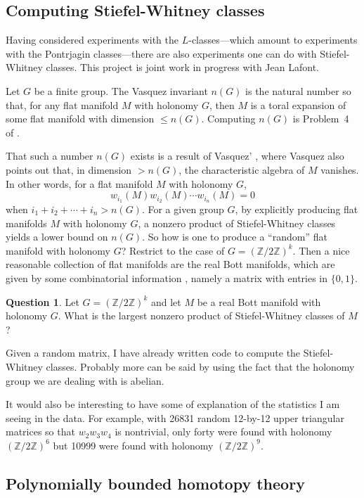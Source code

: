 \documentclass[12pt]{amsart}
\theoremstyle{definition}
\newtheorem{question}[theorem]{Question}
\newcommand{\Z}{\mathbb{Z}}
\begin{document}
\subsection{Computing Stiefel-Whitney classes}

Having considered experiments with the $L$-classes---which amount to
experiments with the Pontrjagin classes---there are also experiments
one can do with Stiefel-Whitney classes.  This project is joint work
in progress with Jean Lafont.

Let $G$ be a finite group.  The Vasquez invariant $n(G)$ is the
natural number so that, for any flat manifold $M$ with holonomy $G$,
then $M$ is a toral expansion of some flat manifold with dimension
$\leq n(G)$.  Computing $n(G)$ is Problem~4 of \cite{MR2252897}.

That such a number $n(G)$ exists is a result of Vasquez'
\cite{MR267487}, where Vasquez also points out that, in dimension $>
n(G)$, the characteristic algebra of $M$ vanishes.  In other words,
for a flat manifold $M$ with holonomy $G$, 
$$
w_{i_1}(M) w_{i_2}(M) \cdots w_{i_n}(M) = 0
$$
when $i_1 + i_2 + \cdots + i_n > n(G)$. For a given group $G$, by
explicitly producing flat manifolds $M$ with holonomy $G$, a nonzero
product of Stiefel-Whitney classes yields a lower bound on $n(G)$.  So
 how is one to produce a ``random'' flat manifold with holonomy $G$?
 Restrict to the case of $G = (\Z/2\Z)^k$.  Then a nice reasonable
 collection of flat manifolds are the real Bott manifolds, which are
 given by some combinatorial information \cite{MR2915482}, namely a
 matrix with entries in $\{0,1\}$.
\begin{question}
  Let $G = (\Z/2\Z)^k$ and let $M$ be a real Bott manifold with
   holonomy $G$.  What is the largest nonzero product of
   Stiefel-Whitney classes of $M$?
\end{question}
 Given a random matrix, I have already written code to compute the
 Stiefel-Whitney classes.  Probably more can be said by using the fact
 that the holonomy group we are dealing with is abelian.

 It would also be interesting to have some of explanation of the
 statistics I am seeing in the data.  For example, with 26831 random
 12-by-12 upper triangular matrices so that $w_2 w_3 w_4$ is
 nontrivial, only forty were found with holonomy $(\Z/2\Z)^6$ but 10999
 were found with holonomy $(\Z/2\Z)^9$.


\subsection{Polynomially bounded homotopy theory}
\label{subsection:polynomially-bounded-topology}
\end{document}
